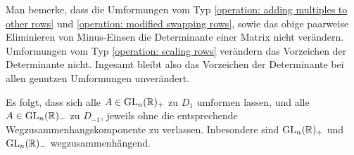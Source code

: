 Man bemerke, dass die Umformungen vom Typ \ref{operation: adding multiples to other rows} und \ref{operation: modified swapping rows}, sowie das obige paarweise Eliminieren von Minus-Einsen  die Determinante einer Matrix nicht verändern. 
Umformungen vom Typ \ref{operation: scaling rows} verändern das Vorzeichen der Determinante nicht.
Ingesamt bleibt also das Vorzeichen der Determinante bei allen genutzen Umformungen unverändert.

Es folgt, dass sich alle $A \in \operatorname{GL}_{n}(\mathbb{R})_+$ zu $D_1$ umformen lassen, und alle $A \in \operatorname{GL}_{n}(\mathbb{R})_-$ zu $D_{-1}$, jeweils ohne die entsprechende Wegzusammenhangskomponente zu verlassen.
Inbesondere sind $\operatorname{GL}_{n}(\mathbb{R})_+$ und $\operatorname{GL}_{n}(\mathbb{R})_-$ wegzusammenhängend.







